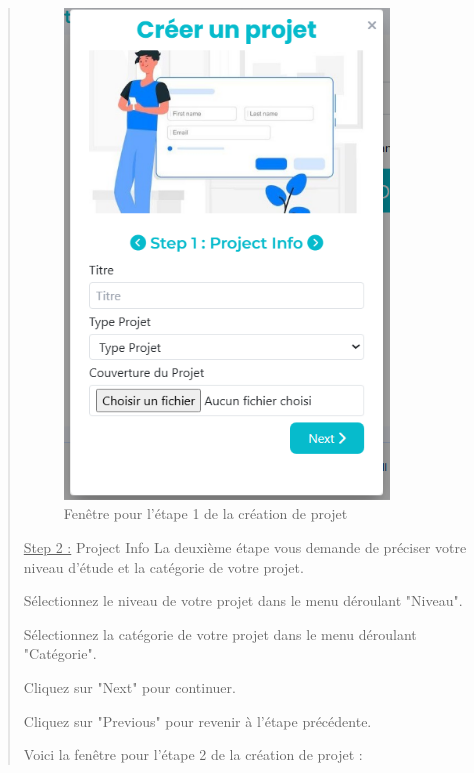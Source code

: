 \documentclass[a4paper,12pt]{article}
\begin{document}
\begin{quote}
\begin{figure}[H]
\centering
\includegraphics[width=0.85\textwidth]{IMAGES/etape1-projet.png}
\caption{Fenêtre pour l'étape 1 de la création de projet}
\label{fig:etape1projet}
\end{figure}
\underline{Step 2 :} Project Info La deuxième étape vous demande de préciser votre niveau d’étude et la catégorie de votre projet.

Sélectionnez le niveau de votre projet dans le menu déroulant "Niveau".

Sélectionnez la catégorie de votre projet dans le menu déroulant "Catégorie".

Cliquez sur "Next" pour continuer.

Cliquez sur "Previous" pour revenir à l'étape précédente.

Voici la fenêtre pour l'étape 2 de la création de projet :


\end{quote}
\end{document}
